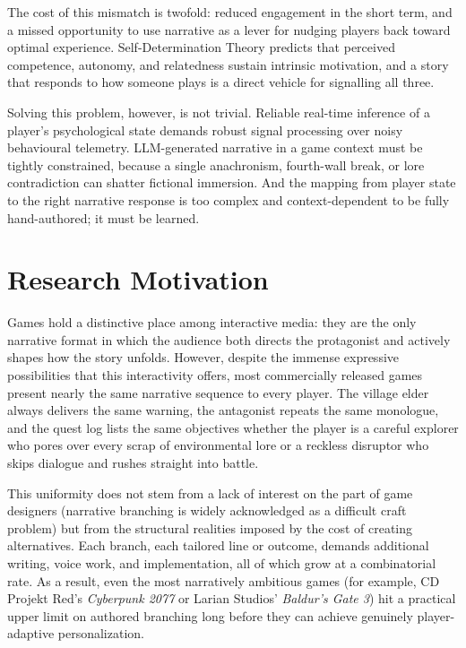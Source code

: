 The cost of this mismatch is twofold: reduced engagement in the short term, and a missed opportunity to use narrative as a lever for nudging players back toward optimal experience. Self-Determination Theory \citep{ryan2000self} predicts that perceived competence, autonomy, and relatedness sustain intrinsic motivation, and a story that responds to how someone plays is a direct vehicle for signalling all three.

Solving this problem, however, is not trivial. Reliable real-time inference of a player's psychological state demands robust signal processing over noisy behavioural telemetry. LLM-generated narrative in a game context must be tightly constrained, because a single anachronism, fourth-wall break, or lore contradiction can shatter fictional immersion. And the mapping from player state to the right narrative response is too complex and context-dependent to be fully hand-authored; it must be learned.

\section{Research Motivation}

Games hold a distinctive place among interactive media: they are the only narrative format in which the audience both directs the protagonist and actively shapes how the story unfolds. However, despite the immense expressive possibilities that this interactivity offers, most commercially released games present nearly the same narrative sequence to every player. The village elder always delivers the same warning, the antagonist repeats the same monologue, and the quest log lists the same objectives whether the player is a careful explorer who pores over every scrap of environmental lore or a reckless disruptor who skips dialogue and rushes straight into battle.

This uniformity does not stem from a lack of interest on the part of game designers (narrative branching is widely acknowledged as a difficult craft problem) but from the structural realities imposed by the cost of creating alternatives. Each branch, each tailored line or outcome, demands additional writing, voice work, and implementation, all of which grow at a combinatorial rate. As a result, even the most narratively ambitious games (for example, CD Projekt Red's \textit{Cyberpunk 2077} or Larian Studios' \textit{Baldur's Gate 3}) hit a practical upper limit on authored branching long before they can achieve genuinely player-adaptive personalization.

